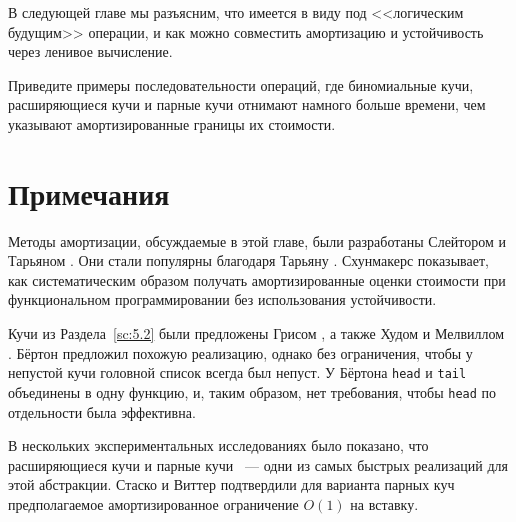 В следующей главе мы разъясним, что имеется в виду под <<логическим
будущим>> операции, и как можно совместить амортизацию и устойчивость
через ленивое вычисление.

\begin{exercise}\label{ex:5.9}
  Приведите примеры последовательности операций, где биномиальные
  кучи, расширяющиеся кучи и парные кучи отнимают намного больше
  времени, чем указывают амортизированные границы их стоимости.
\end{exercise}

\section{Примечания}

Методы амортизации, обсуждаемые в этой главе, были разработаны
Слейтором и Тарьяном \cite{SleatorTarjan1985, SleatorTarjan1986b}. Они
стали популярны благодаря Тарьяну \cite{Tarjan1985}. Схунмакерс
\cite{Schoenmakers1992} показывает, как систематическим образом
получать амортизированные оценки стоимости при функциональном
программировании без использования устойчивости.

Кучи из Раздела~\ref{sc:5.2} были предложены Грисом
\cite[с.~250-251]{Gries1981}, а также Худом и Мелвиллом
\cite{HoodMelville1981}. Бёртон \cite{Burton1982} предложил похожую
реализацию, однако без ограничения, чтобы у непустой кучи головной список всегда был
непуст. У Бёртона \lstinline!head! и \lstinline!tail! объединены в
одну функцию, и, таким образом, нет требования, чтобы \lstinline!head!
по отдельности была эффективна.

В нескольких экспериментальных исследованиях было показано, что
расширяющиеся кучи \cite{Jones1986} и парные кучи
\cite{MoretShapiro1991,Liao1992}~--- одни из самых быстрых
реализаций для этой абстракции. Стаско и Виттер
\cite{StaskoVitter1987} подтвердили для варианта парных куч
предполагаемое амортизированное ограничение $O(1)$ на вставку.

